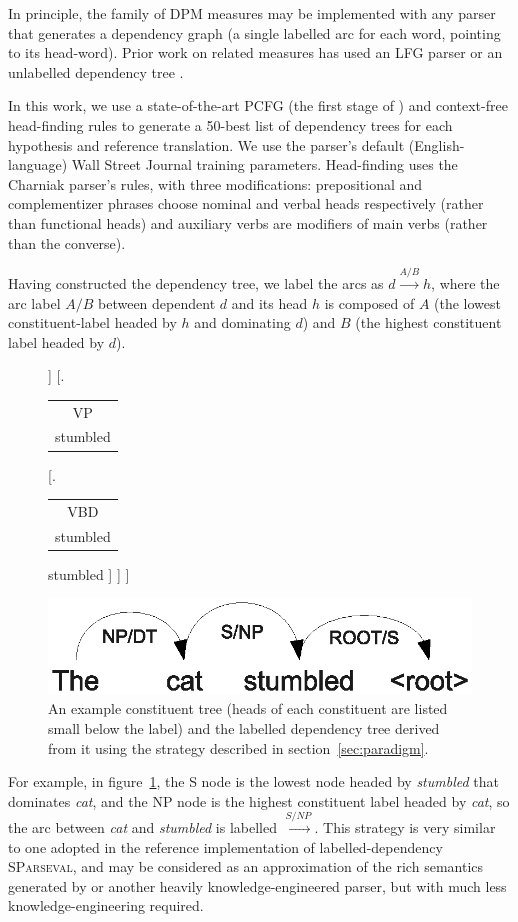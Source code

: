 \documentclass{kluwer}    %
\newcommand{\headlabel}[2]{
  \begin{tabular}{c} #1\\
    {\small #2} \end{tabular}}
\newcommand{\arclabel}[1]{\ensuremath{\stackrel{#1}{\to}}}
\begin{document}
\begin{article}
In principle, the family of DPM measures may be implemented with
any parser that generates a dependency graph (a single labelled arc
for each word, pointing to its head-word). Prior work
\cite{owczarzak07labelleddepseval} on related
measures has used an LFG parser \cite{cahill04lfg} or
an unlabelled dependency tree \cite{liu05syntaxformteval}. 

%
In this work, we use a state-of-the-art PCFG (the first stage of
\cite{charniak-johnson:2005:ACL}) and context-free head-finding rules
\cite{magerman95headfinding} to generate a 50-best list of dependency
trees for each hypothesis and reference translation.  We use the
parser's default (English-language) Wall Street Journal training
parameters.  Head-finding uses the Charniak parser's rules, with three
modifications: prepositional and complementizer phrases choose nominal
and verbal heads respectively (rather than functional heads) and
auxiliary verbs are modifiers of main verbs (rather than the
converse).

Having constructed the dependency tree, we label the arcs as $d
\stackrel{A/B}{\to} h$, where the arc label $A/B$ between dependent
$d$ and its head $h$ is composed of $A$ (the lowest constituent-label
headed by $h$ and dominating $d$) and $B$ (the highest constituent
label headed by $d$). 
\begin{figure}
  \Tree
  [.\headlabel{S}{stumbled}
    [.\headlabel{NP}{cat}
      [.\headlabel{DT}{the} the ]
      [.\headlabel{NN}{cat} cat ]
    ]
    [.\headlabel{VP}{stumbled} 
      [.\headlabel{VBD}{stumbled} stumbled ]
    ]
  ]
  \\
  \begin{center}
    \includegraphics[scale=0.6]{dpm-example-depextract.eps}
  \end{center}
  \caption{An example constituent tree (heads of each constituent are
    listed small below the label) and the labelled dependency tree
    derived from it using the strategy described in
    section~\ref{sec:paradigm}.}
  \label{fig:depextract}
\end{figure}
For example, in figure~\ref{fig:depextract}, the S node is the
lowest node headed by \emph{stumbled} that dominates \emph{cat}, and
the NP node is the highest constituent label headed by \emph{cat}, so
the arc between \emph{cat} and \emph{stumbled} is labelled \arclabel{S/NP}.
%
This strategy is very similar to one adopted in the reference
implementation of labelled-dependency \textsc{SParseval}, and may be
considered as an approximation of the rich semantics generated by
\cite{cahill04lfg} or another heavily knowledge-engineered
parser, but with much less knowledge-engineering required.


\end{article}
\end{document}
